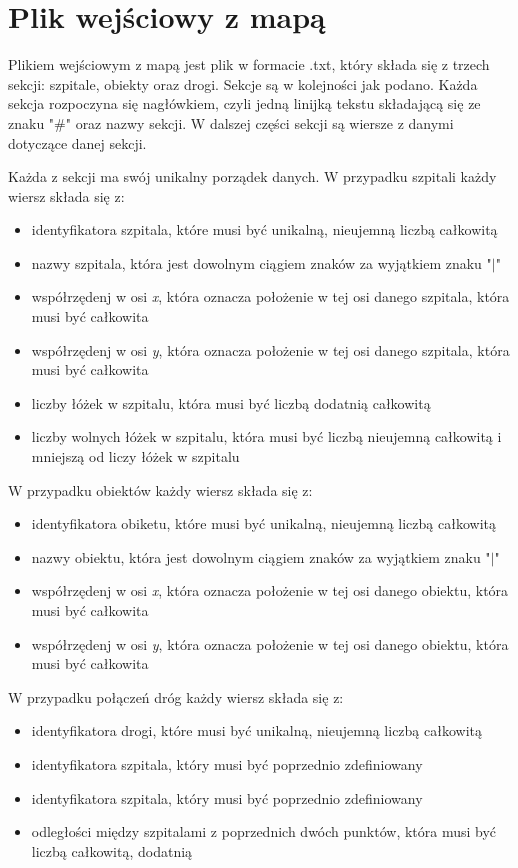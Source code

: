 \documentclass[10pt,a4paper]{article}
\begin{document}
\section{Plik wejściowy z mapą}

Plikiem wejściowym z mapą jest plik w formacie .txt, który składa się z trzech sekcji: szpitale, obiekty oraz drogi. Sekcje są w kolejności jak podano. Każda sekcja rozpoczyna się nagłówkiem, czyli jedną linijką tekstu składającą się ze znaku "\#" oraz nazwy sekcji. W dalszej części sekcji są wiersze z danymi dotyczące danej sekcji.

Każda z sekcji ma swój unikalny porządek danych. W przypadku szpitali każdy wiersz składa się z:
\begin{itemize}
\item identyfikatora szpitala, które musi być unikalną, nieujemną liczbą całkowitą
\item nazwy szpitala, która jest dowolnym ciągiem znaków za wyjątkiem znaku "$\mid$"
\item współrzędenj w osi \textit{x}, która oznacza położenie w tej osi danego szpitala, która musi być całkowita
\item współrzędenj w osi \textit{y}, która oznacza położenie w tej osi danego szpitala, która musi być całkowita
\item liczby łóżek w szpitalu, która musi być liczbą dodatnią całkowitą
\item liczby wolnych łóżek w szpitalu, która musi być liczbą nieujemną całkowitą i mniejszą od liczy łóżek w szpitalu
\end{itemize}
W przypadku obiektów każdy wiersz składa się z:
\begin{itemize}
\item identyfikatora obiketu, które musi być unikalną, nieujemną liczbą całkowitą
\item nazwy obiektu, która jest dowolnym ciągiem znaków za wyjątkiem znaku "$\mid$"
\item współrzędenj w osi \textit{x}, która oznacza położenie w tej osi danego obiektu, która musi być całkowita
\item współrzędenj w osi \textit{y}, która oznacza położenie w tej osi danego obiektu, która musi być całkowita
\end{itemize}
W przypadku połączeń dróg każdy wiersz składa się z:
\begin{itemize}
\item identyfikatora drogi, które musi być unikalną, nieujemną liczbą całkowitą
\item identyfikatora szpitala, który musi być poprzednio zdefiniowany
\item identyfikatora szpitala, który musi być poprzednio zdefiniowany
\item odległości między szpitalami z poprzednich dwóch punktów, która musi być liczbą całkowitą, dodatnią
\end{itemize}
\end{document}

